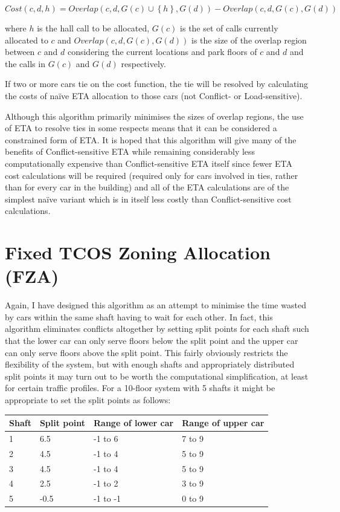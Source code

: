 \documentclass{UoYCSproject}
\begin{document}
\[ Cost(c, d, h) = Overlap(c, d, G(c) \cup \left\{ h \right\}, G(d)) - Overlap(c, d, G(c), G(d)) \]

where $h$ is the hall call to be allocated, $G(c)$ is the set of calls currently allocated to $c$ and $Overlap(c, d, G(c), G(d))$ is the size of the overlap region between $c$ and $d$ considering the current locations and park floors of $c$ and $d$ and the calls in $G(c)$ and $G(d)$ respectively.

If two or more cars tie on the cost function, the tie will be resolved by calculating the costs of na\"{i}ve ETA allocation to those cars (not Conflict- or Load-sensitive).

Although this algorithm primarily minimises the sizes of overlap regions, the use of ETA to resolve ties in some respects means that it can be considered a constrained form of ETA.  It is hoped that this algorithm will give many of the benefits of Conflict-sensitive ETA while remaining considerably less computationally expensive than Conflict-sensitive ETA itself since fewer ETA cost calculations will be required (required only for cars involved in ties, rather than for every car in the building) and all of the ETA calculations are of the simplest na\"{i}ve variant which is in itself less costly than Conflict-sensitive cost calculations.

\section{Fixed TCOS Zoning Allocation (FZA)}

Again, I have designed this algorithm as an attempt to minimise the time wasted by cars within the same shaft having to wait for each other.  In fact, this algorithm eliminates conflicts altogether by setting split points for each shaft such that the lower car can only serve floors below the split point and the upper car can only serve floors above the split point.  This fairly obviously restricts the flexibility of the system, but with enough shafts and appropriately distributed split points it may turn out to be worth the computational simplification, at least for certain traffic profiles.  For a 10-floor system with 5 shafts it might be appropriate to set the split points as follows:

\begin{tabular}{l | l | l | l}
	Shaft & Split point & Range of lower car & Range of upper car \\
	\hline
	1 & 6.5  & -1 to 6  & 7 to 9 \\
	2 & 4.5  & -1 to 4  & 5 to 9 \\
	3 & 4.5  & -1 to 4  & 5 to 9 \\
	4 & 2.5  & -1 to 2  & 3 to 9 \\
	5 & -0.5 & -1 to -1 & 0 to 9
\end{tabular}
\end{document}
